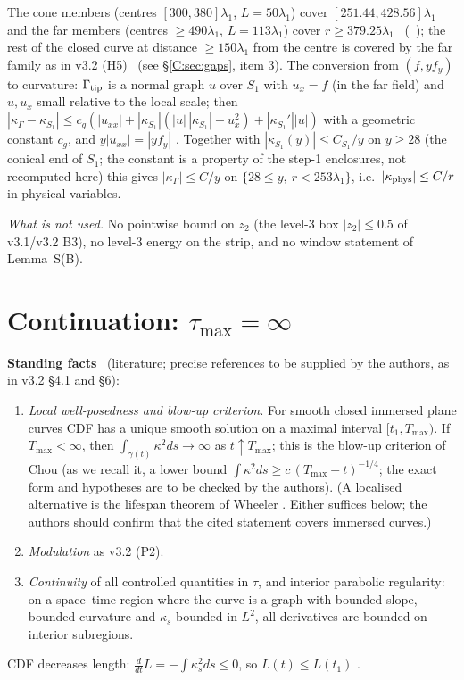 \documentclass[11pt]{article}
\begin{document}
The cone members (centres $[300,380]\lambda_1$, $L=50\lambda_1$) cover $[251.44,428.56]\lambda_1$ and the far members (centres $\ge490\lambda_1$, $L=113\lambda_1$) cover $r\ge379.25\lambda_1$ \tC\ (\SZ\ ); the rest of the closed curve at distance $\ge150\lambda_1$ from the centre is covered by the far family as in v3.2 (H5) \tH\ (see \S\ref{C:sec:gaps}, item 3). The conversion from $(f,yf_y)$ to curvature: $\Gamma_{\rm tip}$ is a normal graph $u$ over $S_1$ with $u_x=f$ (in the far field) and $u,u_x$ small relative to the local scale; then $|\kappa_\Gamma-\kappa_{S_1}|\le c_g(|u_{xx}|+|\kappa_{S_1}|(|u|\,|\kappa_{S_1}|+u_x^2)+|\kappa_{S_1}'||u|)$ with a geometric constant $c_g$, and $y|u_{xx}|=|yf_y|$ \tP. Together with $|\kappa_{S_1}(y)|\le C_{S_1}/y$ on $y\ge28$ (the conical end of $S_1$; the constant is a property of the step-1 enclosures, not recomputed here) this gives $|\kappa_\Gamma|\le C/y$ on $\{28\le y,\ r<253\lambda_1\}$, i.e.\ $|\kappa_{\rm phys}|\le C/r$ in physical variables.

\noindent\emph{What is not used.} No pointwise bound on $z_2$ (the level-3 box $|z_2|\le0.5$ of v3.1/v3.2 B3), no level-3 energy on the strip, and no window statement of Lemma~S(B).

\section{Continuation: $\tau_{\max}=\infty$}\label{C:sec:cont}
\noindent\textbf{Standing facts} \tH\ (literature; precise references to be supplied by the authors, as in v3.2 \S4.1 and \S6):
\begin{enumerate}[label=(P\arabic*$'$),leftmargin=3em]
\item \emph{Local well-posedness and blow-up criterion.} For smooth closed immersed plane curves CDF has a unique smooth solution on a maximal interval $[t_1,T_{\max})$. If $T_{\max}<\infty$, then $\int_{\gamma(t)}\kappa^2ds\to\infty$ as $t\uparrow T_{\max}$; this is the blow-up criterion of Chou \cite{Chou2003} (as we recall it, a lower bound $\int\kappa^2ds\ge c\,(T_{\max}-t)^{-1/4}$; the exact form and hypotheses are to be checked by the authors). (A localised alternative is the lifespan theorem of Wheeler \cite{Wheeler2013}. Either suffices below; the authors should confirm that the cited statement covers immersed curves.)
\item \emph{Modulation} as v3.2 (P2).
\item \emph{Continuity} of all controlled quantities in $\tau$, and interior parabolic regularity: on a space--time region where the curve is a graph with bounded slope, bounded curvature and $\kappa_s$ bounded in $L^2$, all derivatives are bounded on interior subregions.
\end{enumerate}
CDF decreases length: $\frac{d}{dt}L=-\int\kappa_s^2ds\le0$, so $L(t)\le L(t_1)$ \tP.
\end{document}
